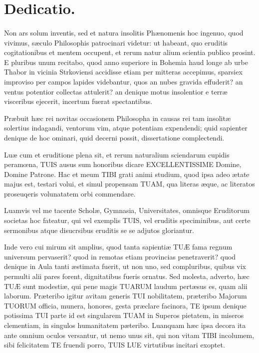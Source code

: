 \documentclass[a4paper, 11pt, oneside, polutonikogreek, latin]{article}
\begin{document}
\section{Dedicatio.}
\paragraph{}
Non ars solum inventis, sed et natura insolitis Phænomenis hoc ingenuo, quod vivimus, sæculo Philosophis patrocinari videtur: ut habeant, quo eruditis cogitationibus et mentem occupent, et rerum natur alium scientia publico prosint. E pluribus unum recitabo, quod anno superiore in Bohemia haud longe ab urbe Thabor in vicinia Strkoviensi accidisse etiam per mitteras accepimus, sparsiex improviso per campos lapides videbantur, quos an nubes gravida effuderit? an ventus potentior collectas attulerit? an denique motus insolentior e terræ visceribus ejecerit, incertum fuerat spectantibus.

Præbuit hæc rei novitas occasionem Philosopha in causas rei tam insolitæ solertius indagandi, ventorum vim, atque potentiam expendendi; quid sapienter denique de hoc ominari, quid decerni possit, dissertatione complectendi.

Luæ cum et eruditione plena sit, et rerum naturalium sciendarum cupidis peramœna, TUIS ausus sum honoribus dicare EXCELLENTISSIME Domine, Domine Patrone. Hac et meum TIBI grati animi studium, quod ipsa adeo ætate majus est, testari volui, et simul propensam TUAM, qua literas æque, ac literatos proseuqeris volunatatem orbi commendare.

Luamvis vel me tacente Scholæ, Gymnasia, Universitates, omnisque Eruditorum societas hoc fateatur, qui vel exemplis TUIS, vel eruditis speciminibus, aut certe sermonibus atque disucrsibus eruditis se se adjutos gloriantur.

Inde vero cui mirum sit amplius, quod tanta sapientiæ TUÆ fama regnum universum pervaserit? quod in remotas etiam provincias penetraverit? quod denique in Aula tanti æstimata fuerit, ut non uno, sed compluribus, quibus vix permulti alii pares forent, dignitatibus fueris ornatus. Sed molesta, adverto, hæc TUÆ sunt modestiæ, qui pene magis TUARUM laudum pertæsus es, quam alii laborum. Præteribo igitur avitam generis TUI nobilitatem, præteribo Majorum TUORUM officia, munera, honores, gesta præclare facinora, TE ipsum denique potissima TUI parte id est singularem TUAM in Superos pietatem, in miseros clementiam, in singulos humanitatem pæteribo. Luanquam hæc ipsa decora ita ante omnium oculos versantur, ut nemo unus sit, qui non vitam TIBI incolumem, sibi felicitatem TE fruendi porro, TUIS LUE virtutibus incitari exoptet.
\end{document}

